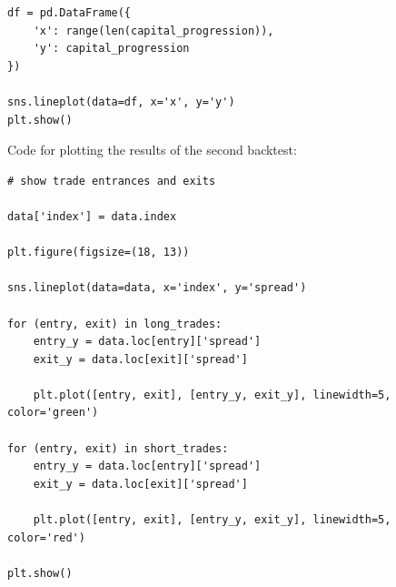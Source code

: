 \documentclass{article}
\begin{document}
\begin{spacing}{2.0}
\begin{lstlisting}
df = pd.DataFrame({
    'x': range(len(capital_progression)),
    'y': capital_progression
})

sns.lineplot(data=df, x='x', y='y')
plt.show()
\end{lstlisting}

Code for plotting the results of the second backtest:

\begin{lstlisting}
# show trade entrances and exits

data['index'] = data.index

plt.figure(figsize=(18, 13))

sns.lineplot(data=data, x='index', y='spread')

for (entry, exit) in long_trades:
    entry_y = data.loc[entry]['spread']
    exit_y = data.loc[exit]['spread']

    plt.plot([entry, exit], [entry_y, exit_y], linewidth=5, color='green')

for (entry, exit) in short_trades:
    entry_y = data.loc[entry]['spread']
    exit_y = data.loc[exit]['spread']

    plt.plot([entry, exit], [entry_y, exit_y], linewidth=5, color='red')

plt.show()
\end{lstlisting}

\end{spacing}
\end{document}
